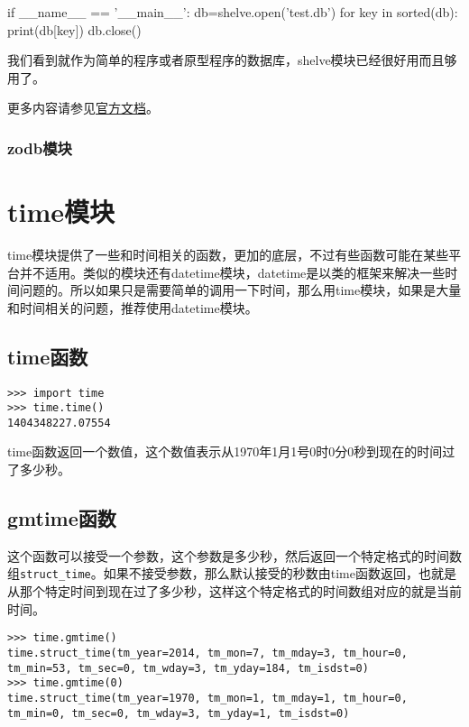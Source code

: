 \documentclass[12pt,oneside]{book}
\begin{document}
\begin{common-format}
\begin{tcbpython}
if __name__ == '__main__':
    db=shelve.open('test.db')
    for key in sorted(db):
        print(db[key])
    db.close()
\end{tcbpython}

我们看到就作为简单的程序或者原型程序的数据库，shelve模块已经很好用而且够用了。

\begin{Large}
更多内容请参见\href{https://docs.python.org/3/library/shelve.html}{官方文档}。
\end{Large}

\subsection{zodb模块}


\chapter{time模块}
time模块提供了一些和时间相关的函数，更加的底层，不过有些函数可能在某些平台并不适用。类似的模块还有datetime模块，datetime是以类的框架来解决一些时间问题的。所以如果只是需要简单的调用一下时间，那么用time模块，如果是大量和时间相关的问题，推荐使用datetime模块。

\section{time函数}
\begin{Verbatim}
>>> import time
>>> time.time()
1404348227.07554
\end{Verbatim}
time函数返回一个数值，这个数值表示从1970年1月1号0时0分0秒到现在的时间过了多少秒。

\section{gmtime函数}
这个函数可以接受一个参数，这个参数是多少秒，然后返回一个特定格式的时间数组\verb+struct_time+。如果不接受参数，那么默认接受的秒数由time函数返回，也就是从那个特定时间到现在过了多少秒，这样这个特定格式的时间数组对应的就是当前时间。

\begin{Verbatim}
>>> time.gmtime()
time.struct_time(tm_year=2014, tm_mon=7, tm_mday=3, tm_hour=0, 
tm_min=53, tm_sec=0, tm_wday=3, tm_yday=184, tm_isdst=0)
>>> time.gmtime(0)
time.struct_time(tm_year=1970, tm_mon=1, tm_mday=1, tm_hour=0, 
tm_min=0, tm_sec=0, tm_wday=3, tm_yday=1, tm_isdst=0)
\end{Verbatim}


\end{common-format}
\end{document}
